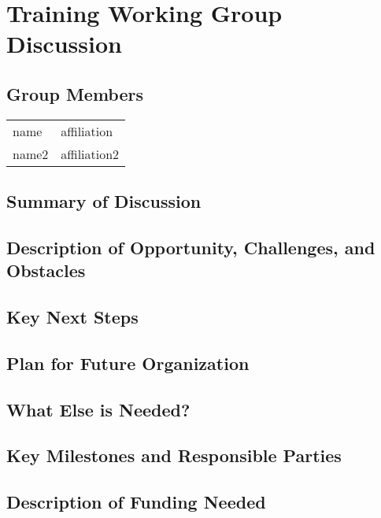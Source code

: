 \section{Training Working Group Discussion}
\label{sec:appendix_training}

\subsection{Group Members}
{\small
\begin{longtable}{ll}
   name            &  affiliation
\\ name2           &  affiliation2
\end{longtable}
}

\subsection{Summary of Discussion}

\subsection{Description of Opportunity, Challenges, and Obstacles}


\subsection{Key Next Steps}


\subsection{Plan for Future Organization}


\subsection{What Else is Needed?}


\subsection{Key Milestones and Responsible Parties}


\subsection{Description of Funding Needed}
